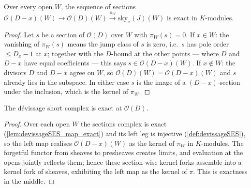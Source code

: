 \begin{lemma}
  \label{lem:devissageSES_map_exact}
  \leanok
  Over every open \(W\), the sequence of sections
  \(\mathcal O(D-x)(W) \to \mathcal O(D)(W) \xrightarrow{\pi_W} \mathrm{sky}_x(J)(W)\) is exact in
  \(K\)-modules.
\end{lemma}
\begin{proof}
  \leanok
  Let \(s\) be a section of \(\mathcal O(D)\) over \(W\) with \(\pi_W(s) = 0\). If \(x \in W\): the
  vanishing of \(\pi_W(s)\) means the jump class of \(s\) is zero, i.e.\ \(s\) has pole order
  \(\le D_x - 1\) at \(x\); together with the \(D\)-bound at the other points --- where \(D\) and
  \(D-x\) have equal coefficients --- this says \(s \in \mathcal O(D-x)(W)\). If \(x \notin W\): the
  divisors \(D\) and \(D-x\) agree on \(W\), so \(\mathcal O(D)(W) = \mathcal O(D-x)(W)\) and \(s\)
  already lies in the subspace. In either case \(s\) is the image of a \((D-x)\)-section under the
  inclusion, which is the kernel of \(\pi_W\).
\end{proof}

\begin{theorem}
  \label{thm:devissageSES_exact}
  \leanok
  The dévissage short complex is exact at \(\mathcal O(D)\).
\end{theorem}
\begin{proof}
  \leanok
  Over each open \(W\) the sections complex is exact (\ref{lem:devissageSES_map_exact}) and its left
  leg is injective (\ref{def:devissageSES}), so the left map realises \(\mathcal O(D-x)(W)\) as the
  kernel of \(\pi_W\) in \(K\)-modules. The forgetful functor from sheaves to presheaves creates
  limits, and evaluation at the opens jointly reflects them; hence these section-wise kernel forks
  assemble into a kernel fork of sheaves, exhibiting the left map as the kernel of \(\pi\). This is
  exactness in the middle.
\end{proof}

